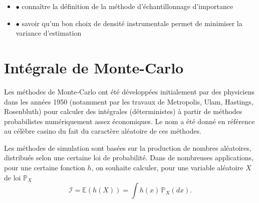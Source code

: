 \label{V-echantillonnage-dimportance}

\begin{itemize}
\tightlist
\item
  $\mathord{\bullet}$ connaître la définition de la méthode
  d'échantillonnage d'importance
\item
  $\mathord{\bullet}$ savoir qu'un bon choix de densité instrumentale
  permet de minimiser la variance d'estimation
\end{itemize}

\chapter{Intégrale de
Monte-Carlo}\label{V-intuxe9grale-de-monte-carlo-1}

Les méthodes de Monte-Carlo ont été développées initialement par des
physiciens dans les années 1950 (notamment par les travaux de
Metropolis, Ulam, Hastings, Rosenbluth) pour calculer des intégrales
(déterministes) à partir de méthodes probabilistes numériquement assez
économiques. Le nom a été donné en référence au célèbre casino du fait
du caractère aléatoire de ces méthodes.

Les méthodes de simulation sont basées sur la production de nombres
aléatoires, distribués selon une certaine loi de probabilité. Dans de
nombreuses applications, pour une certaine fonction \(h\), on souhaite
calculer, pour une variable aléatoire \(X\) de loi \(\mathbb{P}_X\)
\[\mathcal{I}=\mathbb{E}\left(h(X)\right)=\int h(x)\, \mathbb{P}_X(dx).\]

